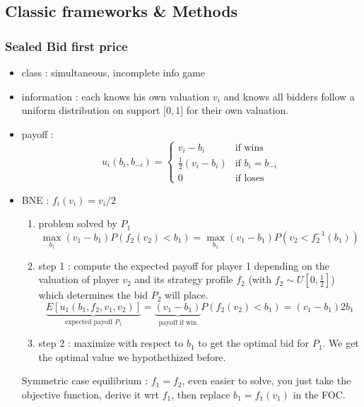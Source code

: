 \documentclass{article}
\begin{document}
\subsection{Classic frameworks \& Methods}

\subsubsection{Sealed Bid first price }
\begin{itemize}
    \item class : simultaneous, incomplete info game 
    \item information : each knows his own valuation $v_i$ and knows all bidders follow a uniform distribution on support [$0,1$] for their own valuation. 
    \item payoff : 
    \begin{equation}  
        u_i(b_i,b_{-i}) =   
        \begin{cases}  
            v_i - b_i & \text{if wins} \\ 
            \frac{1}{2}(v_i-b_i) & \text{if $b_i=b_{-i}$}\\ 
            0 & \text{if loses}  
        \end{cases}  
    \end{equation} 
    \item BNE : $f_i(v_i)=v_i/2$
    \begin{Proof}
        \begin{enumerate}
            \item problem solved by $P_1$
            \begin{equation}
                \max_{b_1}(v_1-b_1)P(f_2(v_2)<b_1) = \max_{b_1}(v_1-b_1)P(v_2<f_2^{-1}(b_1))
            \end{equation}
            \item step 1 : compute the expected payoff for player 1 depending on the valuation of player $v_2$ and its strategy profile $f_2$ (with $f_2 \sim U[0,\frac{1}{2}]$) which determines the bid $P_2$ will place. 
            \begin{equation}
                \underbrace{E[u_1(b_1,f_2, v_1,v_2)]}_{\text{expected payoff $P_1$}} = \underbrace{(v_1-b_1)}_{\text{payoff if win}}P(f_2(v_2)<b_1) = (v_1-b_1)2b_1 
            \end{equation}
            \item step 2 : maximize with respect to $b_1$ to get the optimal bid for $P_1$. We get the optimal value we hypothethized before. 
        \end{enumerate}
        Symmetric case equilibrium : $f_1=f_2$, even easier to solve, you just take the objective function, derive it wrt $f_1$, then replace $b_1=f_1(v_1)$ in the FOC. 
    \end{Proof}

\end{itemize}
\end{document}
